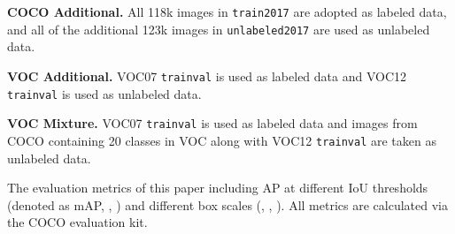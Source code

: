 \documentclass[10pt,twocolumn,letterpaper]{article}
\begin{document}
\noindent \textbf{COCO Additional.} All 118k images in \texttt{train2017} are adopted as labeled data, and all of the additional 123k images in \texttt{unlabeled2017} are used as unlabeled data.


\noindent \textbf{VOC Additional.} VOC07 \texttt{trainval} is used as labeled data and VOC12 \texttt{trainval} is used as unlabeled data.

\noindent \textbf{VOC Mixture.} VOC07 \texttt{trainval} is used as labeled data and images from COCO containing 20 classes in VOC along with VOC12 \texttt{trainval} are taken as unlabeled data.

The evaluation metrics of this paper including AP at different IoU thresholds (\eg  denoted as mAP, , ) and different box scales (\eg , , ). All metrics are calculated via the COCO evaluation kit.
\end{document}

